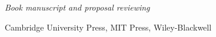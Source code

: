 \documentclass[12pt]{article}
\begin{document}







\bigskip

\noindent\emph{Book manuscript and proposal reviewing\vspace{0.05in}}
 
\ind Cambridge University Press, {MIT Press,} Wiley-Blackwell
\end{document}
